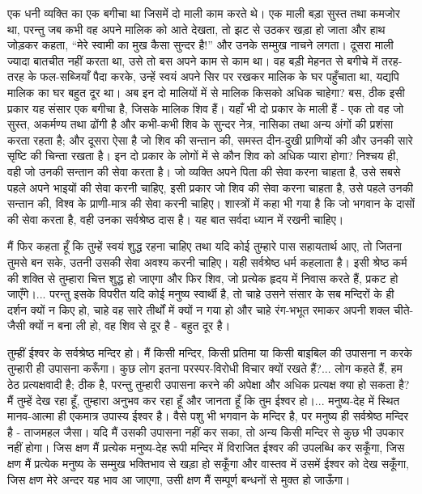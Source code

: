 एक धनी व्यक्ति का एक बगीचा था जिसमें दो माली काम करते थे। एक माली बड़ा सुस्त तथा कमजोर था, परन्तु जब कभी वह अपने मालिक को आते देखता, तो झट से उठकर खड़ा हो जाता और हाथ जोड़कर कहता, “मेरे स्वामी का मुख कैसा सुन्दर है!” और उनके सम्मुख नाचने लगता। दूसरा माली ज्यादा बातचीत नहीं करता था, उसे तो बस अपने काम से काम था। वह बड़ी मेहनत से बगीचे में तरह-तरह के फल-सब्जियाँ पैदा करके, उन्हें स्वयं अपने सिर पर रखकर मालिक के घर पहुँचाता था, यद्यपि मालिक का घर बहुत दूर था। अब इन दो मालियों में से मालिक किसको अधिक चाहेगा? बस, ठीक इसी प्रकार यह संसार एक बगीचा है, जिसके मालिक शिव हैं। यहाँ भी दो प्रकार के माली हैं - एक तो वह जो सुस्त, अकर्मण्य तथा ढोंगी है और कभी-कभी शिव के सुन्दर नेत्र, नासिका तथा अन्य अंगों की प्रशंसा करता रहता है; और दूसरा ऐसा है जो शिव की सन्तान की, समस्त दीन-दुखी प्राणियों की और उनकी सारे सृष्टि की चिन्ता रखता है। इन दो प्रकार के लोगों में से कौन शिव को अधिक प्यारा होगा? निश्चय ही, वही जो उनकी सन्तान की सेवा करता है। जो व्यक्ति अपने पिता की सेवा करना चाहता है, उसे सबसे पहले अपने भाइयों की सेवा करनी चाहिए, इसी प्रकार जो शिव की सेवा करना चाहता है, उसे पहले उनकी सन्तान की, विश्व के प्राणी-मात्र की सेवा करनी चाहिए। शास्त्रों में कहा भी गया है कि जो भगवान के दासों की सेवा करता है, वही उनका सर्वश्रेष्ठ दास है। यह बात सर्वदा ध्यान में रखनी चाहिए। 

मैं फिर कहता हूँ कि तुम्हें स्वयं शुद्ध रहना चाहिए तथा यदि कोई तुम्हारे पास सहायतार्थ आए, तो जितना तुमसे बन सके, उतनी उसकी सेवा अवश्य करनी चाहिए। यही सर्वश्रेष्ठ धर्म कहलाता है। इसी श्रेष्ठ कर्म की शक्ति से तुम्हारा चित्त शुद्ध हो जाएगा और फिर शिव, जो प्रत्येक हृदय में निवास करते हैं, प्रकट हो जाएँगे।... परन्तु इसके विपरीत यदि कोई मनुष्य स्वार्थी है, तो चाहे उसने संसार के सब मन्दिरों के ही दर्शन क्यों न किए हो, चाहे वह सारे तीर्थों में क्यों न गया हो और चाहे रंग-भभूत रमाकर अपनी शक्ल चीते-जैसी क्यों न बना ली हो, वह शिव से दूर है - बहुत दूर है। 

तुम्हीं ईश्वर के सर्वश्रेष्ठ मन्दिर हो। मैं किसी मन्दिर, किसी प्रतिमा या किसी बाइबिल की उपासना न करके तुम्हारी ही उपासना करूँगा। कुछ लोग इतना परस्पर-विरोधी विचार क्यों रखते हैं?... लोग कहते हैं, हम ठेठ प्रत्यक्षवादी है; ठीक है, परन्तु तुम्हारी उपासना करने की अपेक्षा और अधिक प्रत्यक्ष क्या हो सकता है? मैं तुम्हें देख रहा हूँ, तुम्हारा अनुभव कर रहा हूँ और जानता हूँ कि तुम ईश्वर हो।... मनुष्य-देह में स्थित मानव-आत्मा ही एकमात्र उपास्य ईश्वर है। वैसे पशु भी भगवान के मन्दिर है, पर मनुष्य ही सर्वश्रेष्ठ मन्दिर है - ताजमहल जैसा। यदि मैं उसकी उपासना नहीं कर सका, तो अन्य किसी मन्दिर से कुछ भी उपकार नहीं होगा। जिस क्षण मैं प्रत्येक मनुष्य-देह रूपी मन्दिर में विराजित ईश्वर की उपलब्धि कर सकूँगा, जिस क्षण मैं प्रत्येक मनुष्य के सम्मुख भक्तिभाव से खड़ा हो सकूँगा और वास्तव में उसमें ईश्वर को देख सकूँगा, जिस क्षण मेरे अन्दर यह भाव आ जाएगा, उसी क्षण मैं सम्पूर्ण बन्धनों से मुक्त हो जाऊँगा। 

